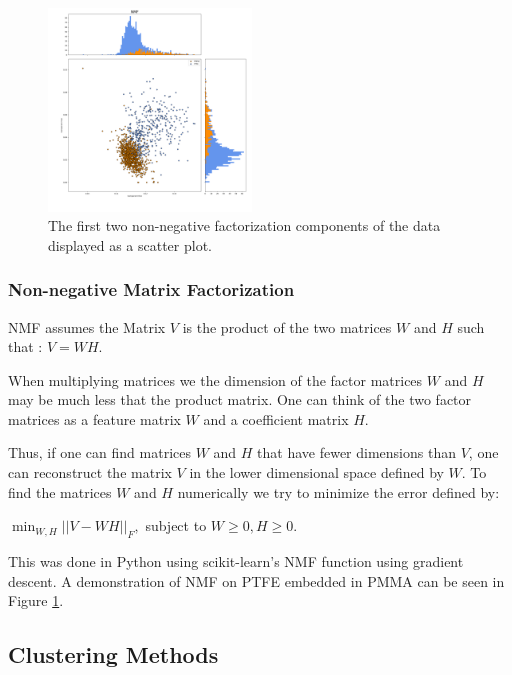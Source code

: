 \documentclass[a4paper,11pt]{article}
\begin{document}
\begin{figure}
  \vspace{-20pt}
  \begin{center}
    \includegraphics[width=0.48\textwidth]{figures/NMFnone.png}
  \end{center}
  \vspace{-20pt}
  \caption{The first two non-negative factorization components of the data displayed as a scatter plot.}
  \vspace{-10pt}
  \label{NMF}
\end{figure}

\subsubsection{Non-negative Matrix Factorization}

NMF assumes the Matrix $V$ is the product of the two matrices $W$ and $H$ such that : $V = WH$. 

When multiplying matrices we the dimension of the factor matrices $W$ and $H$ may be much less that the product matrix. One can think of the two factor matrices as a feature matrix $W$ and a coefficient matrix $H$.

Thus, if one can find matrices $W$ and $H$ that have fewer dimensions than $V$, one can reconstruct the matrix $V$ in the lower dimensional space defined by $W$. To find the matrices $W$ and $H$ numerically we try to minimize the error defined by:

$ \min_{W,H} || V - WH ||_F,$ subject to $W \geq 0, H \geq 0.$

This was done in Python using scikit-learn's NMF function using gradient descent. A demonstration of NMF on PTFE embedded in PMMA can be seen in Figure \ref{NMF}.

\subsection{Clustering Methods}
\end{document}
